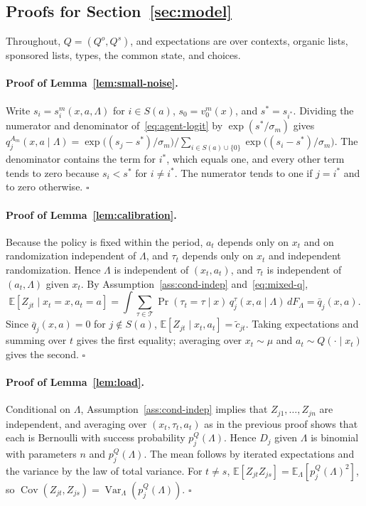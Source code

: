 \documentclass[opre,dblanonrev]{informs4}
\providecommand{\E}{\mathbb{E}}
\providecommand{\1}{\mathbf{1}}
\providecommand{\Var}{\operatorname{Var}}
\providecommand{\Cov}{\operatorname{Cov}}
\begin{document}
\begin{APPENDICES}

\section{Proofs for Section~\ref{sec:model}}\label{app:model}

Throughout, $Q=(Q^o,Q^s)$, and expectations are over contexts, organic lists, sponsored lists, types, the common state, and choices.

\paragraph{Proof of Lemma~\ref{lem:small-noise}.}
Write $s_i=s_i^m(x,a,\Lambda)$ for $i\in S(a)$, $s_0=v_0^m(x)$, and $s^\ast=s_{i^\ast}$. Dividing the numerator and denominator of~\eqref{eq:agent-logit} by $\exp(s^\ast/\sigma_m)$ gives
$q_j^{A_m}(x,a\mid\Lambda)=\exp\bigl((s_j-s^\ast)/\sigma_m\bigr)\big/\sum_{i\in S(a)\cup\{0\}}\exp\bigl((s_i-s^\ast)/\sigma_m\bigr)$.
The denominator contains the term for $i^\ast$, which equals one, and every other term tends to zero because $s_i<s^\ast$ for $i\ne i^\ast$. The numerator tends to one if $j=i^\ast$ and to zero otherwise. \hfill$\square$

\paragraph{Proof of Lemma~\ref{lem:calibration}.}
Because the policy is fixed within the period, $a_t$ depends only on $x_t$ and on randomization independent of $\Lambda$, and $\tau_t$ depends only on $x_t$ and independent randomization. Hence $\Lambda$ is independent of $(x_t,a_t)$, and $\tau_t$ is independent of $(a_t,\Lambda)$ given $x_t$. By Assumption~\ref{ass:cond-indep} and~\eqref{eq:mixed-q},
\[
\E[Z_{jt}\mid x_t=x,a_t=a]=\int\sum_{\tau\in\mathcal T}\Pr(\tau_t=\tau\mid x)\,q_j^\tau(x,a\mid\Lambda)\,dF_\Lambda=\bar q_j(x,a).
\]
Since $\bar q_j(x,a)=0$ for $j\notin S(a)$, $\E[Z_{jt}\mid x_t,a_t]=\tilde c_{jt}$. Taking expectations and summing over $t$ gives the first equality; averaging over $x_t\sim\mu$ and $a_t\sim Q(\cdot\mid x_t)$ gives the second. \hfill$\square$

\paragraph{Proof of Lemma~\ref{lem:load}.}
Conditional on $\Lambda$, Assumption~\ref{ass:cond-indep} implies that $Z_{j1},\ldots,Z_{jn}$ are independent, and averaging over $(x_t,\tau_t,a_t)$ as in the previous proof shows that each is Bernoulli with success probability $p_j^Q(\Lambda)$. Hence $D_j$ given $\Lambda$ is binomial with parameters $n$ and $p_j^Q(\Lambda)$. The mean follows by iterated expectations and the variance by the law of total variance. For $t\ne s$, $\E[Z_{jt}Z_{js}]=\E_\Lambda[p_j^Q(\Lambda)^2]$, so $\Cov(Z_{jt},Z_{js})=\Var_\Lambda(p_j^Q(\Lambda))$. \hfill$\square$


\end{APPENDICES}
\end{document}
